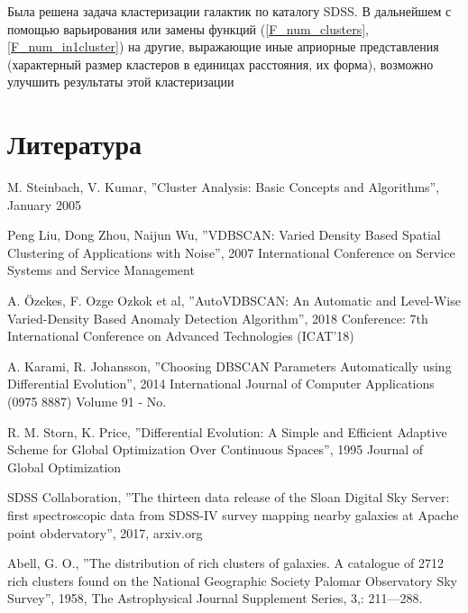 \documentclass[12pt,fleqn]{article}
\begin{document}
Была решена задача кластеризации галактик по каталогу SDSS.
В дальнейшем с помощью варьирования или замены функций (\ref{F_num_clusters}, \ref{F_num_in1cluster}) на другие, выражающие иные априорные представления (характерный размер кластеров в единицах расстояния, их форма), возможно улучшить результаты этой кластеризации

\newpage


\section{Литература}

\begin{thebibliography}{2}

M. Steinbach, V. Kumar, ''Cluster Analysis: Basic Concepts and Algorithms'', January 2005

Peng Liu, Dong Zhou, Naijun Wu,  ''VDBSCAN: Varied Density Based Spatial Clustering of Applications with Noise'', 2007 International Conference on Service Systems and Service Management

A. Özekes, F. Ozge Ozkok et al, ''AutoVDBSCAN: An Automatic and Level-Wise Varied-Density Based Anomaly Detection Algorithm'',  2018
Conference: 7th International Conference on Advanced Technologies (ICAT'18)

A. Karami, R. Johansson, ''Choosing DBSCAN Parameters Automatically using
Differential Evolution'', 2014 International Journal of Computer Applications (0975 8887) Volume 91 - No.

R. M. Storn, K. Price, ''Differential Evolution: A Simple and Efficient Adaptive Scheme for Global Optimization Over Continuous Spaces'', 1995 Journal of Global Optimization

SDSS Collaboration, ''The thirteen data release of the Sloan Digital Sky Server: first spectroscopic data from SDSS-IV survey mapping nearby galaxies at Apache point obdervatory'', 2017, arxiv.org

Abell, G. O., ''The distribution of rich clusters of galaxies. A catalogue of 2712 rich clusters found on the National Geographic Society Palomar Observatory Sky Survey'', 1958, The Astrophysical Journal Supplement Series, 3,: 211—288.

\end{thebibliography}
\end{document}
